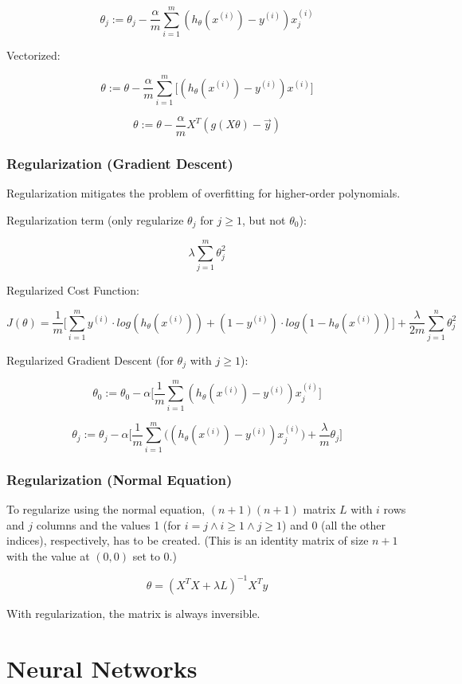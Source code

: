 \documentclass[a4paper,11pt]{scrartcl}
\begin{document}
$$ \theta_j := \theta_j - \frac{\alpha}{m} \sum^m_{i=1} (h_{\theta}(x^{(i)}) - y^{(i)}) x^{(i)}_j $$

Vectorized:

$$ \theta := \theta - \frac{\alpha}{m} \sum^m_{i=1} \Bigg[ (h_{\theta}(x^{(i)}) - y^{(i)}) x^{(i)} \Bigg] $$

$$ \theta := \theta - \frac{\alpha}{m} X^T(g(X\theta)-\vec{y}) $$

\subsubsection{Regularization (Gradient Descent)}

Regularization mitigates the problem of overfitting for higher-order polynomials.

Regularization term (only regularize $\theta_j$ for $j \geq 1$, but not $\theta_0$):

$$ \lambda \sum_{j=1}^m \theta_j^2 $$

Regularized Cost Function:

$$ J(\theta) = \frac{1}{m} \Bigg[ \sum^m_{i=1} y^{(i)} \cdot log (h_{\theta}(x^{(i)})) + (1-y^{(i)}) \cdot log (1 - h_{\theta}(x^{(i)})) \Bigg] + \frac{\lambda}{2m} \sum_{j=1}^n \theta_j^2 $$

Regularized Gradient Descent (for $\theta_j$ with $j \geq 1$):

$$ \theta_0 := \theta_0 - \alpha \Bigg[\frac{1}{m} \sum^m_{i=1} (h_{\theta}(x^{(i)}) - y^{(i)}) x^{(i)}_j \Bigg] $$

$$ \theta_j := \theta_j - \alpha \Bigg[\frac{1}{m} \sum^m_{i=1} \Big( (h_{\theta}(x^{(i)}) - y^{(i)}) x^{(i)}_j \Big) + \frac{\lambda}{m}\theta_j \Bigg] $$

\subsubsection{Regularization (Normal Equation)}

To regularize using the normal equation, $(n+1)(n+1)$ matrix $L$ with $i$ rows and $j$ columns and the values 1 (for $i=j \land i \geq 1 \land j \geq 1$) and 0 (all the other indices), respectively, has to be created. (This is an identity matrix of size $n+1$ with the value at $(0,0)$ set to 0.)

$$ \theta = (X^TX+\lambda L)^{-1}X^Ty $$

With regularization, the matrix is always inversible.

\section{Neural Networks}
\end{document}

